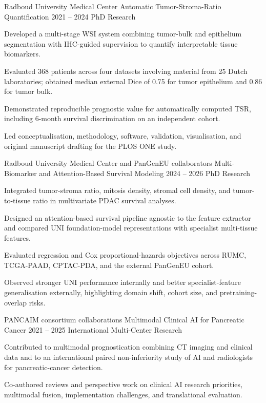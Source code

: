 \begin{cventries}
\cventry
  {Radboud University Medical Center}
  {Automatic Tumor-Stroma-Ratio Quantification}
  {2021 -- 2024}
  {PhD Research}
  {
    \begin{cvitems}
      \item {Developed a multi-stage WSI system combining tumor-bulk and epithelium segmentation with IHC-guided supervision to quantify interpretable tissue biomarkers.}
      \item {Evaluated 368 patients across four datasets involving material from 25 Dutch laboratories; obtained median external Dice of 0.75 for tumor epithelium and 0.86 for tumor bulk.}
      \item {Demonstrated reproducible prognostic value for automatically computed TSR, including 6-month survival discrimination on an independent cohort.}
      \item {Led conceptualisation, methodology, software, validation, visualisation, and original manuscript drafting for the PLOS ONE study.}
    \end{cvitems}
  }

\cventry
  {Radboud University Medical Center and PanGenEU collaborators}
  {Multi-Biomarker and Attention-Based Survival Modeling}
  {2024 -- 2026}
  {PhD Research}
  {
    \begin{cvitems}
      \item {Integrated tumor-stroma ratio, mitosis density, stromal cell density, and tumor-to-tissue ratio in multivariate PDAC survival analyses.}
      \item {Designed an attention-based survival pipeline agnostic to the feature extractor and compared UNI foundation-model representations with specialist multi-tissue features.}
      \item {Evaluated regression and Cox proportional-hazards objectives across RUMC, TCGA-PAAD, CPTAC-PDA, and the external PanGenEU cohort.}
      \item {Observed stronger UNI performance internally and better specialist-feature generalisation externally, highlighting domain shift, cohort size, and pretraining-overlap risks.}
    \end{cvitems}
  }

\cventry
  {PANCAIM consortium collaborations}
  {Multimodal Clinical AI for Pancreatic Cancer}
  {2021 -- 2025}
  {International Multi-Center Research}
  {
    \begin{cvitems}
      \item {Contributed to multimodal prognostication combining CT imaging and clinical data and to an international paired non-inferiority study of AI and radiologists for pancreatic-cancer detection.}
      \item {Co-authored reviews and perspective work on clinical AI research priorities, multimodal fusion, implementation challenges, and translational evaluation.}
    \end{cvitems}
  }
\end{cventries}
